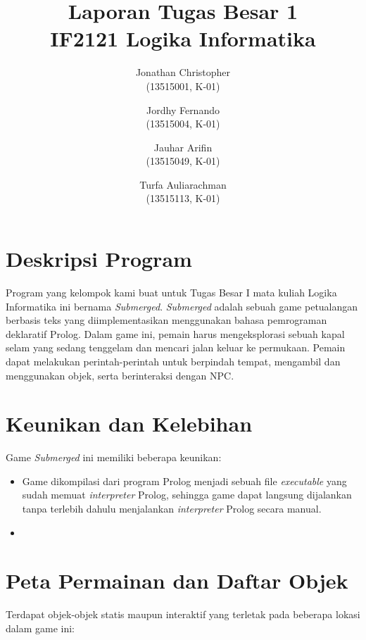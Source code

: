 \documentclass[a4paper,titlepage]{article}
\begin{document}
	\title{Laporan Tugas Besar 1 \\ IF2121 Logika Informatika}
	\author{
			Jonathan Christopher \\
			(13515001, K-01)
		\and
			Jordhy Fernando \\
			(13515004, K-01)
		\and
			Jauhar Arifin \\
			(13515049, K-01)
		\and
			Turfa Auliarachman \\
			(13515113, K-01)
	}
	\maketitle

	\section{Deskripsi Program}

		Program yang kelompok kami buat untuk Tugas Besar I mata kuliah Logika Informatika ini bernama \textit{Submerged}. \textit{Submerged} adalah sebuah game petualangan berbasis teks yang diimplementasikan menggunakan bahasa pemrograman deklaratif Prolog. Dalam game ini, pemain harus mengeksplorasi sebuah kapal selam yang sedang tenggelam dan mencari jalan keluar ke permukaan. Pemain dapat melakukan perintah-perintah untuk berpindah tempat, mengambil dan menggunakan objek, serta berinteraksi dengan NPC.

	\section{Keunikan dan Kelebihan}

		Game \textit{Submerged} ini memiliki beberapa keunikan:

		\begin{itemize}
			\item Game dikompilasi dari program Prolog menjadi sebuah file \textit{executable} yang sudah memuat \textit{interpreter} Prolog, sehingga game dapat langsung dijalankan tanpa terlebih dahulu menjalankan \textit{interpreter} Prolog secara manual.
			\item
		\end{itemize}

	\section{Peta Permainan dan Daftar Objek}

		\noindent Terdapat objek-objek statis maupun interaktif yang terletak pada beberapa lokasi dalam game ini:
\end{document}
